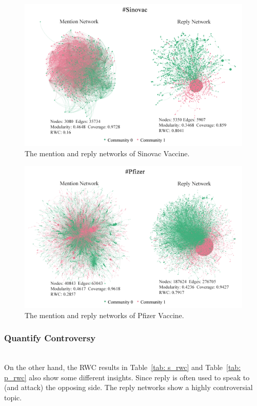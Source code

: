 \documentclass[sigplan,screen]{acmart}
\begin{document}
\begin{figure}[h]
  \centering
  \includegraphics[width=0.9\linewidth]{resource/xiaoliang/s_m_r.png}
  \caption{The mention and reply networks of Sinovac Vaccine.}
  \label{fig:s}
\end{figure}

\begin{figure}[h]
  \centering
  \includegraphics[width=0.9\linewidth]{resource/xiaoliang/p_m_r.png}
  \caption{The mention and reply networks of Pfizer Vaccine.}
  \label{fig:p}
\end{figure}


\subsubsection{Quantify Controversy}
~\\
On the other hand, the RWC results in Table~\ref{tab: s_rwc} and Table~\ref{tab: p_rwc} also show some different insights. Since reply is often used to speak to (and attack) the opposing side. The reply networks show a highly controversial topic. 
\end{document}
